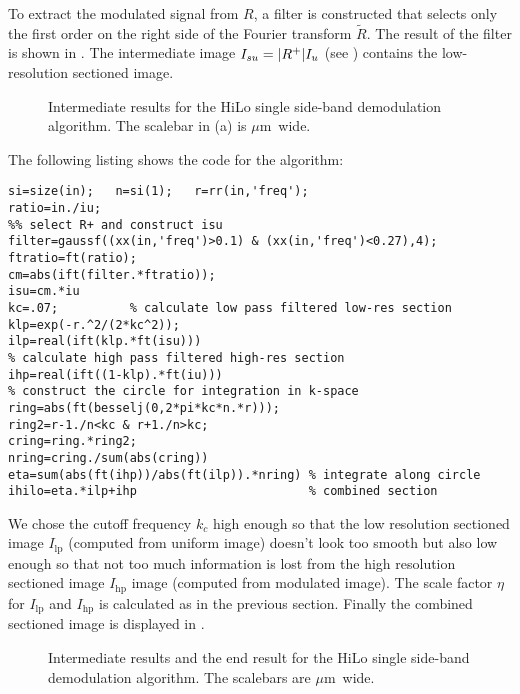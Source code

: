 To extract the modulated signal from $R$, a filter is constructed that
selects only the first order on the right side of the Fourier
transform $\tilde R$. The result of the filter is shown in
. The intermediate image $I_{su}=\mathopen| R^+ \mathclose|I_u$ (see
) contains the low-resolution sectioned image.

\begin{figure}[htb]
  \centering {}
  \caption{Intermediate results for the HiLo single side-band
    demodulation algorithm. The scalebar in (a) is \unit[2]{$\mu$m}
    wide.}
  \label{fig:hilo2}
\end{figure}

The following listing shows the code for the algorithm:
\begin{lstlisting}
si=size(in);   n=si(1);   r=rr(in,'freq');
ratio=in./iu;
%% select R+ and construct isu
filter=gaussf((xx(in,'freq')>0.1) & (xx(in,'freq')<0.27),4);
ftratio=ft(ratio);
cm=abs(ift(filter.*ftratio));
isu=cm.*iu
kc=.07;          % calculate low pass filtered low-res section
klp=exp(-r.^2/(2*kc^2));
ilp=real(ift(klp.*ft(isu)))
% calculate high pass filtered high-res section
ihp=real(ift((1-klp).*ft(iu)))
% construct the circle for integration in k-space
ring=abs(ft(besselj(0,2*pi*kc*n.*r)));
ring2=r-1./n<kc & r+1./n>kc;
cring=ring.*ring2;
nring=cring./sum(abs(cring))
eta=sum(abs(ft(ihp))/abs(ft(ilp)).*nring) % integrate along circle
ihilo=eta.*ilp+ihp                        % combined section
\end{lstlisting}
We chose the cutoff frequency $k_c$ high enough so that the low
resolution sectioned image $I_\textrm{lp}$ (computed from uniform
image) doesn't look too smooth but also low enough so that not too
much information is lost from the high resolution sectioned image
$I_\textrm{hp}$ image (computed from modulated image). The scale
factor $\eta$ for $I_\textrm{lp}$ and $I_\textrm{hp}$ is calculated as
in the previous section. Finally the combined sectioned image is
displayed in .
\begin{figure}[htb]
  \centering
  \caption{Intermediate results and the end result for the HiLo single
    side-band demodulation algorithm. The scalebars are
    \unit[2]{$\mu$m} wide.}
  \label{fig:hilo2_2}
\end{figure}
